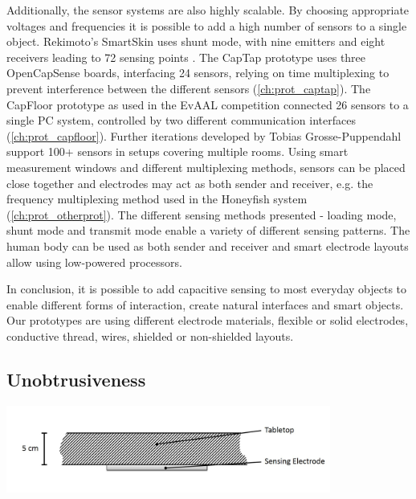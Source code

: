 Additionally, the sensor systems are also highly scalable. By choosing appropriate voltages and frequencies it is possible to add a high number of sensors to a single object. Rekimoto's SmartSkin uses shunt mode, with nine emitters and eight receivers leading to 72 sensing points \cite{rekimoto2002smartskin}. The CapTap prototype uses three OpenCapSense boards, interfacing 24 sensors, relying on time multiplexing to prevent interference between the different sensors (\ref{ch:prot_captap}). The CapFloor prototype as used in the EvAAL competition connected 26 sensors to a single PC system, controlled by two different communication interfaces (\ref{ch:prot_capfloor}). Further iterations developed by Tobias Grosse-Puppendahl support 100+ sensors in setups covering multiple rooms. Using smart measurement windows and different multiplexing methods, sensors can be placed close together and electrodes may act as both sender and receiver, e.g. the frequency multiplexing method used in the Honeyfish system \cite{grosse2012honey} (\ref{ch:prot_otherprot}). The different sensing methods presented - loading mode, shunt mode and transmit mode enable a variety of different sensing patterns. The human body can be used as both sender and receiver and smart electrode layouts allow using low-powered processors. 

In conclusion, it is possible to add capacitive sensing to most everyday objects to enable different forms of interaction, create natural interfaces and smart objects. Our prototypes are using different electrode materials, flexible or solid electrodes, conductive thread, wires, shielded or non-shielded layouts.
 
\subsection{Unobtrusiveness}
\begin{minipage}{\linewidth}
\centering
\includegraphics[width=0.8\textwidth]{images/eval_unobtrusive}
\label{fig:eval_unobtrusive}
\end{minipage}

